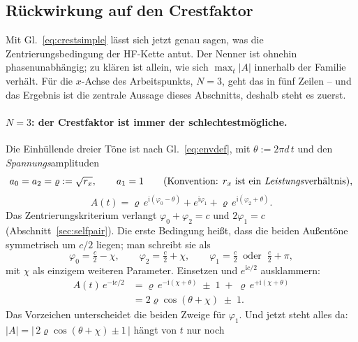 \documentclass[11pt,a4paper]{article}
\begin{document}
\subsection{Rückwirkung auf den Crestfaktor}\label{sec:crestback}

Mit Gl.~\eqref{eq:crestsimple} lässt sich jetzt genau sagen, was die
Zentrierungsbedingung der HF-Kette antut. Der Nenner ist ohnehin
phasenunabhängig; zu klären ist allein, wie sich $\max_t|A|$ innerhalb der
Familie verhält. Für die $x$-Achse des Arbeitspunkts, $N=3$, geht das in
fünf Zeilen -- und das Ergebnis ist die zentrale Aussage dieses Abschnitts,
deshalb steht es zuerst.

\paragraph{\boldmath$N=3$: der Crestfaktor ist immer der schlechtestmögliche.}
Die Einhüllende dreier Töne ist nach
Gl.~\eqref{eq:envdef}, mit $\theta := 2\pi d\,t$ und den
\emph{Spannungs}amplituden
\begin{equation}
  a_0 = a_2 = \varrho := \sqrt{r_x} , \qquad a_1 = 1
  \qquad\text{(Konvention: } r_x \text{ ist ein \emph{Leistungs}verhältnis),}
  \label{eq:rhodef}
\end{equation}
\begin{equation}
  A(t) = \varrho\,e^{\mathrm{i}(\varphi_0-\theta)} + e^{\mathrm{i}\varphi_1}
       + \varrho\,e^{\mathrm{i}(\varphi_2+\theta)} .
\end{equation}
Das Zentrierungskriterium verlangt $\varphi_0+\varphi_2 = c$ und
$2\varphi_1 = c$ (Abschnitt~\ref{sec:selfpair}). Die erste Bedingung heißt,
dass die beiden Außentöne symmetrisch um $c/2$ liegen; man schreibt sie als
\begin{equation}
  \varphi_0 = \tfrac{c}{2}-\chi , \qquad
  \varphi_2 = \tfrac{c}{2}+\chi , \qquad
  \varphi_1 = \tfrac{c}{2} \;\;\text{oder}\;\; \tfrac{c}{2}+\pi ,
\end{equation}
mit $\chi$ als einzigem weiteren Parameter. Einsetzen und $e^{\mathrm{i}c/2}$
ausklammern:
\begin{align}
  A(t)\,e^{-\mathrm{i}c/2}
  &= \varrho\,e^{-\mathrm{i}(\chi+\theta)} \;\pm\; 1 \;+\; \varrho\,e^{+\mathrm{i}(\chi+\theta)}\\
  &= 2\varrho\cos(\theta+\chi) \;\pm\; 1 .
  \label{eq:n3direct}
\end{align}
Das Vorzeichen unterscheidet die beiden Zweige für $\varphi_1$. Und jetzt
steht alles da: $|A| = |\,2\varrho\cos(\theta+\chi)\pm1\,|$ hängt von $t$ nur noch
\end{document}
